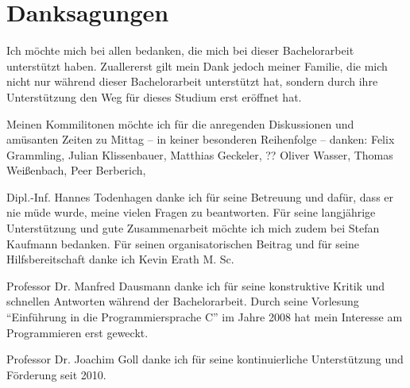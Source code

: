 
\chapter*{Danksagungen}

Ich möchte mich bei allen bedanken, die mich bei dieser Bachelorarbeit unterstützt haben.
Zuallererst gilt mein Dank jedoch meiner Familie, die mich nicht nur während dieser Bachelorarbeit unterstützt hat, sondern durch ihre Unterstützung den Weg für dieses Studium erst eröffnet hat.

Meinen Kommilitonen möchte ich für die anregenden Diskussionen und amüsanten Zeiten zu Mittag -- in keiner besonderen Reihenfolge -- danken:
Felix Grammling,
Julian Klissenbauer,
Matthias Geckeler,
?? Oliver Wasser,
Thomas Weißenbach,
Peer Berberich,



Dipl.-Inf. Hannes Todenhagen danke ich für seine Betreuung und dafür, dass er nie müde wurde, meine vielen Fragen zu beantworten.%
Für seine langjährige Unterstützung und gute Zusammenarbeit möchte ich mich zudem bei  Stefan Kaufmann bedanken.
 Für seinen organisatorischen Beitrag und für seine Hilfsbereitschaft danke ich Kevin Erath M. Sc.

Professor Dr. Manfred Dausmann danke ich für seine konstruktive Kritik und schnellen Antworten während der Bachelorarbeit. Durch seine Vorlesung \enquote{Einführung in die Programmiersprache C} im Jahre 2008 hat mein Interesse am Programmieren erst geweckt.

Professor Dr. Joachim Goll danke ich für seine kontinuierliche Unterstützung und Förderung seit 2010.
